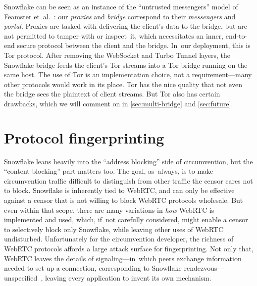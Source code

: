 \documentclass[letterpaper,twocolumn]{article}
\newcommand{\firstterm}[1]{\textit{#1}}
\begin{document}
Snowflake can be seen as an instance of the
``untrusted messengers'' model of Feamster et~al.~\cite[\S 3]{Feamster2003a}:
our \firstterm{proxies} and \firstterm{bridge} correspond to their
\firstterm{messengers} and \firstterm{portal}.
Proxies are tasked with delivering the client's data to the bridge,
but are not permitted to tamper with or inspect~it,
which necessitates an inner,
end-to-end secure protocol between the client and the bridge.
In~our deployment, this is Tor protocol.
After removing the WebSocket and Turbo Tunnel layers,
the Snowflake bridge feeds the client's Tor streams
into a Tor bridge running on the same host.
The use of Tor is an implementation choice, not a requirement---many
other protocols would work in its place.
Tor has the nice quality that
not even the bridge
sees the plaintext of client streams.
But Tor also has certain drawbacks,
which we will comment on in
\autoref{sec:multi-bridge}
and
\autoref{sec:future}.

\section{Protocol fingerprinting}
\label{sec:fingerprinting}


Snowflake leans heavily into the ``address blocking'' side of circumvention,
but the ``content blocking'' part matters too.
The goal, as~always, is to make circumvention traffic
difficult to distinguish from other traffic the censor cares not to block.
Snowflake is inherently tied to WebRTC,
and can only be effective against a censor
that is not willing to block WebRTC protocols wholesale.
But even within that scope,
there are many variations in \emph{how}
WebRTC is implemented and used,
which, if~not carefully considered, might enable a censor
to selectively block only Snowflake,
while leaving other uses of WebRTC undisturbed.
Unfortunately for the circumvention developer,
the richness of WebRTC protocols
affords a large attack surface for fingerprinting.
Not only that, WebRTC leaves the details of
signaling---in~which peers exchange information
needed to set up a connection,
corresponding to Snowflake rendezvous---unspecified~\cite[\S 3]{rfc8825},
leaving every application to invent its own mechanism.
\end{document}
